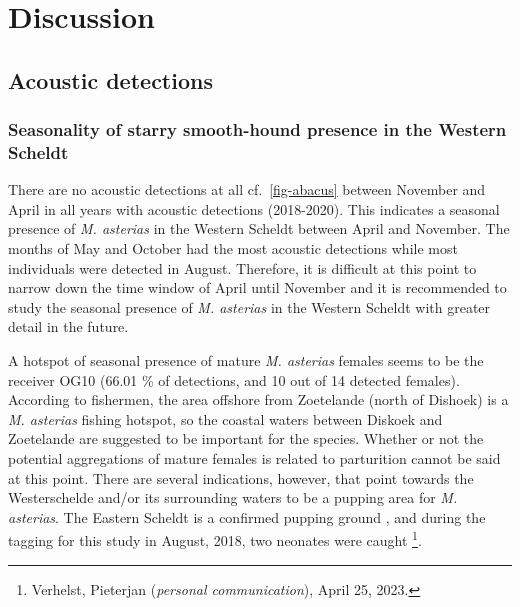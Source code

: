 \documentclass[
  authoryear,
  review,
  3p]{elsarticle}
\begin{document}
\hypertarget{discussion}{%
\section{Discussion}\label{discussion}}

\hypertarget{acoustic-detections-2}{%
\subsection{Acoustic detections}\label{acoustic-detections-2}}

\hypertarget{seasonality-of-starry-smooth-hound-presence-in-the-western-scheldt}{%
\subsubsection{Seasonality of starry smooth-hound presence in the
Western
Scheldt}\label{seasonality-of-starry-smooth-hound-presence-in-the-western-scheldt}}

There are no acoustic detections at all cf.~\ref{fig-abacus} between
November and April in all years with acoustic detections (2018-2020).
This indicates a seasonal presence of \emph{M. asterias} in the Western
Scheldt between April and November. The months of May and October had
the most acoustic detections while most individuals were detected in
August. Therefore, it is difficult at this point to narrow down the time
window of April until November and it is recommended to study the
seasonal presence of \emph{M. asterias} in the Western Scheldt with
greater detail in the future.

A hotspot of seasonal presence of mature \emph{M. asterias} females
seems to be the receiver OG10 (66.01 \% of detections, and 10 out of 14
detected females). According to fishermen, the area offshore from
Zoetelande (north of Dishoek) is a \emph{M. asterias} fishing hotspot,
so the coastal waters between Diskoek and Zoetelande are suggested to be
important for the species. Whether or not the potential aggregations of
mature females is related to parturition cannot be said at this point.
There are several indications, however, that point towards the
Westerschelde and/or its surrounding waters to be a pupping area for
\emph{M. asterias}. The Eastern Scheldt is a confirmed pupping ground
\citep{breve_2016}, and during the tagging for this study in August,
2018, two neonates \citep[around 30 cm TL,][]{farrell_2010} were caught
\footnote{Verhelst, Pieterjan (\emph{personal communication}), April 25,
  2023.}.
\end{document}
